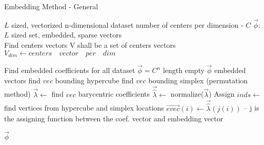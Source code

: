 		\begin{algorithm}
			\caption{Embedding Method - General}
			\begin{algorithmic}
			 
			
			\REQUIRE $L$ sized, vectorized n-dimensional dataset
			\REQUIRE number of centers per dimension - $C$
			\ENSURE $\overrightarrow{\phi}$: $L$ sized set, embedded, sparse vectors\\
			
			\STATE Find centers vectors
			\STATE V shall be a set of centers vectors
			\STATE $V_{dim} \leftarrow centers \quad vector \quad per \quad dim$
			\ENDFOR
			
			\STATE Find embedded coefficients for all dataset
			\STATE $\overrightarrow{\phi} = C^n$ length empty $\overrightarrow{\phi}$ embedded vectors
			\STATE find $vec$ bounding hypercube 
			\STATE find $vec$ bounding simplex (permutation method)
			\STATE $\overrightarrow{\lambda} \leftarrow$ find $vec$ barycentric coefficients 
			\STATE $\overrightarrow{\hat{\lambda}} \leftarrow$ normalize($\overrightarrow{\lambda}$)
			\ENDFOR
			\STATE Assign
			\STATE $inds \leftarrow$ find vertices from hypercube and simplex locations
			\STATE $\overrightarrow{evec}(i) \leftarrow \overrightarrow{\hat{\lambda}}(j(i))$ -- j is the assigning function between the coef. vector and embedding vector
			\ENDFOR
			\ENDFOR
			
			\RETURN $\overrightarrow{\phi}$

			
			\end{algorithmic}
		\end{algorithm}
	 
	

